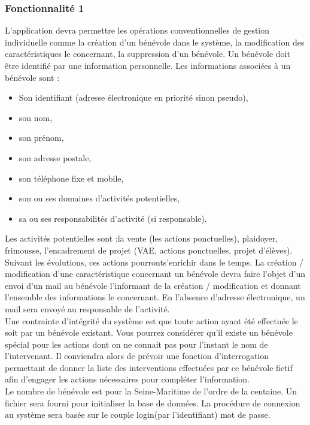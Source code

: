 \subsubsection{Fonctionnalité 1}
L'application devra permettre les opérations conventionnelles de gestion
individuelle comme la création d'un bénévole dans le système, la modification des caractéristiques le concernant, la suppression d'un bénévole.
Un bénévole doit être identifié par une information personnelle. 
Les informations associées à un bénévole sont :
\begin{itemize}
\item Son identifiant (adresse électronique en priorité sinon pseudo), \\
\item son nom, \\
\item son prénom, \\
\item son adresse postale, \\
\item son téléphone fixe et mobile, \\
\item son ou ses domaines d'activités potentielles, \\
\item sa ou ses responsabilités d'activité (si responsable). \\
\end{itemize}

Les activités potentielles sont :la vente (les actions ponctuelles), plaidoyer, frimousse, l'encadrement de projet (VAE, actions ponctuelles, projet d'élèves). Suivant les évolutions, ces actions pourronts'enrichir dans le temps. 
La création / modification d'une caractéristique concernant un bénévole devra faire l'objet d'un envoi d'un mail au bénévole l'informant de la création / modification et donnant l'ensemble des informations le concernant. En l'absence d'adresse électronique, un mail sera envoyé au responsable de l'activité.\\
Une contrainte d'intégrité du système est que toute action ayant été effectuée le soit par un bénévole existant. 
Vous pourrez considérer qu'il existe un bénévole spécial pour les actions dont on ne connait pas pour l'instant le nom de l'intervenant. Il conviendra alors de prévoir une fonction d'interrogation permettant de donner la liste des interventions effectuées par ce bénévole fictif afin d'engager les actions nécessaires pour compléter l'information.
\\
Le nombre de bénévole est pour la Seine-Maritime de l'ordre de la centaine. Un fichier sera fourni pour initialiser la base de données. 
La procédure de connexion au système sera basée sur le couple login(par l'identifiant) mot de passe.
\\

